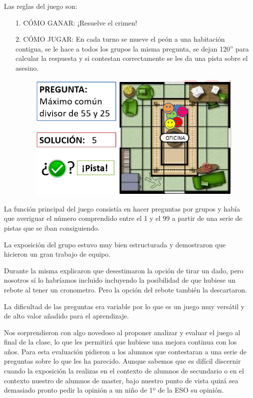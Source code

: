 Las reglas del juego son:
\begin{itemize}
\item[1.] CÓMO GANAR: ¡Resuelve el crimen!  

\item[2.] CÓMO JUGAR: En cada turno se mueve el peón a una habitación contigua, se le hace a todos los grupos la misma pregunta, se dejan 120'' para calcular la respuesta y si contestan correctamente se les da una pista sobre el asesino.

\begin{figure}[h]
\centering
\includegraphics[scale=0.6]{img/cluedo3.jpg}
\end{figure}

\end{itemize}

 
La función principal del juego consistía en hacer preguntas por grupos y había que averiguar el número comprendido entre el 1 y el 99 a partir de una serie de pistas que se iban consiguiendo.

La exposición del grupo estuvo muy bien estructurada y demostraron que hicieron un gran trabajo de equipo.

Durante la misma explicaron que desestimaron la opción de tirar un dado, pero nosotros sí lo habríamos incluido incluyendo la posibilidad de que hubiese un rebote al tener un cronometro. Pero la opción del rebote también la descartaron.

La dificultad de las preguntas era variable por lo que es un juego muy versátil y de alto valor añadido para el aprendizaje.

Nos sorprendieron con algo novedoso al proponer analizar y evaluar el juego al final de la clase, lo que les permitirá que hubiese una mejora continua con los años. Para esta evaluación pidieron a los alumnos que contestaran a una serie de preguntas sobre lo que les ha parecido. Aunque sabemos que es difícil discernir cuando la exposición la realizas en el contexto de alumnos de secundario o en el contexto nuestro de alumnos de master, bajo nuestro punto de vista quizá sea demasiado pronto pedir la opinión a un niño de 1º de la ESO su opinión.

